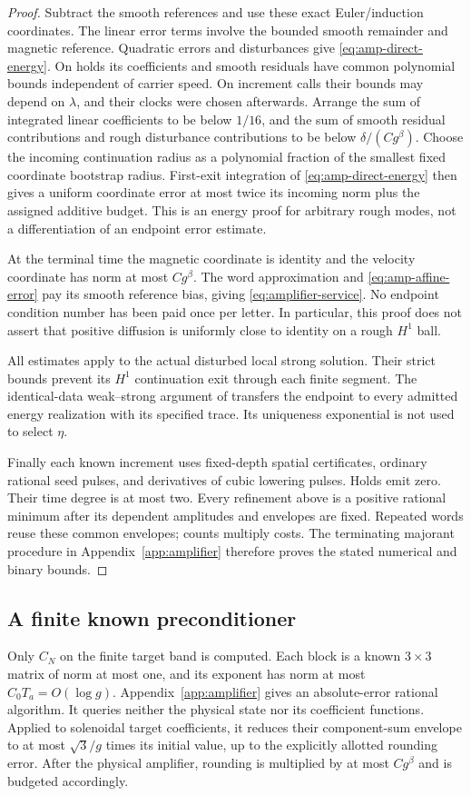 \documentclass[11pt,a4paper]{amsart}
\theoremstyle{definition}
\theoremstyle{remark}
\numberwithin{equation}{section}
\begin{document}
\begin{proof}
Subtract the smooth references and use these exact Euler/induction
coordinates.  The linear error terms involve the bounded smooth
remainder and magnetic reference.  Quadratic errors and disturbances
give \eqref{eq:amp-direct-energy}.  On holds its coefficients and
smooth residuals have common polynomial bounds independent of
carrier speed.  On increment calls their bounds may depend on
$\lambda$, and their clocks were chosen afterwards.
Arrange the sum of integrated linear coefficients to be below
$1/16$, and the sum of smooth residual contributions and rough
disturbance contributions to be below
$\delta/(Cg^\beta)$.
Choose the incoming continuation radius as a polynomial fraction of
the smallest fixed coordinate bootstrap radius.  First-exit
integration of \eqref{eq:amp-direct-energy} then gives a uniform
coordinate error at most twice its incoming norm plus the assigned
additive budget.  This is an energy proof for arbitrary rough modes,
not a differentiation of an endpoint error estimate.

At the terminal time the magnetic coordinate is identity and the
velocity coordinate has norm at most $Cg^\beta$.
The word approximation and \eqref{eq:amp-affine-error} pay its smooth
reference bias, giving \eqref{eq:amplifier-service}.
No endpoint condition number has been paid once per letter.
In particular, this proof does not assert that positive diffusion is
uniformly close to identity on a rough $H^1$ ball.

All estimates apply to the actual disturbed local strong solution.
Their strict bounds prevent its $H^1$ continuation exit through each
finite segment.  The identical-data weak--strong argument of
\cite[Section~10]{Common} transfers the endpoint to every admitted
energy realization with its specified trace.  Its uniqueness
exponential is not used to select $\eta$.

Finally each known increment uses fixed-depth spatial certificates,
ordinary rational seed pulses, and derivatives of cubic lowering
pulses.  Holds emit zero.  Their time degree is at most two.
Every refinement above is a positive rational minimum after its
dependent amplitudes and envelopes are fixed.  Repeated words reuse
these common envelopes; counts multiply costs.
The terminating majorant procedure in Appendix~\ref{app:amplifier}
therefore proves the stated numerical and binary bounds.
\end{proof}

\subsection{A finite known preconditioner}
Only $C_N$ on the finite target band is computed.  Each block is a known
$3\times3$ matrix of norm at most one, and its exponent has norm
at most $C_0T_a=O(\log g)$.  Appendix~\ref{app:amplifier} gives an
absolute-error rational algorithm.  It queries neither the physical
state nor its coefficient functions.  Applied to solenoidal target
coefficients, it reduces their component-sum envelope to at most
$\sqrt3/g$ times its initial value, up to the explicitly allotted rounding error.
After the physical amplifier, rounding is multiplied by at most
$Cg^\beta$ and is budgeted accordingly.
\end{document}
